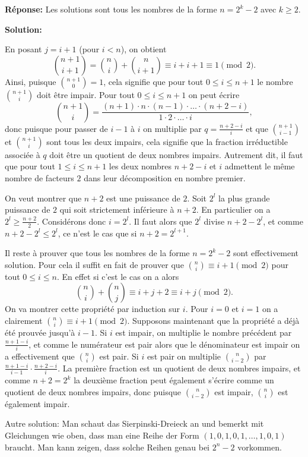 \documentclass[language=german,style=solution]{smo}
\begin{document}
\begin{enumerate}
\textbf{Réponse:} Les solutions sont tous les nombres de la forme $n = 2^k - 2$ avec $k\geq 2$.

\textbf{Solution:}

En posant $j = i+1$ (pour $i < n$), on obtient
\[
	\binom{n+1}{i+1} = \binom{n}{i} + \binom{n}{i+1} \equiv i + i + 1 \equiv 1 \pmod{2}.
\]
Ainsi, puisque $\binom{n+1}{0} = 1$, cela signifie que pour tout $0\leq i \leq n+1$ le nombre $\binom{n+1}{i}$ doit être impair. Pour tout $0\leq i\leq n+1$ on peut écrire
\[
	\binom{n+1}{i} = \frac{(n+1)\cdot n\cdot(n-1)\cdot\ldots\cdot (n+2-i)}{1\cdot 2\cdot\ldots\cdot i},
\]
donc puisque pour passer de $i-1$ à $i$ on multiplie par $q= \frac{n+2-i}{i}$ et que $\binom{n+1}{i-1}$ et $\binom{n+1}{i}$ sont tous les deux impairs, cela signifie que la fraction irréductible associée à $q$ doit être un quotient de deux nombres impairs. Autrement dit, il faut que pour tout $1\leq i\leq n+1$ les deux nombres $n+2-i$ et $i$ admettent le même nombre de facteurs $2$ dans leur décomposition en nombre premier.

On veut montrer que $n+2$ est une puissance de $2$. Soit $2^l$ la plus grande puissance de $2$ qui soit strictement inférieure à $n+2$. En particulier on a $2^l \geq \frac{n+2}{2}$. Considérons donc $i = 2^l$. Il faut alors que $2^l$ divise $n+2 - 2^l$, et comme $n+2 - 2^l \leq 2^l$, ce n'est le cas que si $n+2 = 2^{l+1}$.

Il reste à prouver que tous les nombres de la forme $n = 2^k-2$ sont effectivement solution. Pour cela il suffit en fait de prouver que $\binom{n}{i} \equiv i+1 \pmod{2}$ pour tout $0\leq i\leq n$. En effet si c'est le cas on a alors
\[
	\binom{n}{i} + \binom{n}{j} \equiv i + j + 2 \equiv i + j \pmod{2}.
\]
On va montrer cette propriété par induction sur $i$. Pour $i = 0$ et $i = 1$ on a clairement $\binom{n}{i}\equiv i + 1 \pmod{2}$. Supposons maintenant que la propriété a déjà été prouvée jusqu'à $i-1$. Si $i$ est impair, on multiplie le nombre précédent par $\frac{n+1-i}{i}$, et comme le numérateur est pair alors que le dénominateur est impair on a effectivement que $\binom{n}{i}$ est pair. Si $i$ est pair on multiplie $\binom{n}{i-2}$ par $\frac{n+1-i}{i-1}\cdot\frac{n+2-i}{i}$. La première fraction est un quotient de deux nombres impairs, et comme $n+2 = 2^k$ la deuxième fraction peut également s'écrire comme un quotient de deux nombres impairs, donc puisque $\binom{n}{i-2}$ est impair, $\binom{n}{i}$ est également impair.

Autre solution: Man schaut das Sierpinski-Dreieck an und bemerkt mit Gleichungen wie oben, dass man eine Reihe der Form $(1,0,1,0,1,\ldots,1,0,1)$ braucht. Man kann zeigen, dass solche Reihen genau bei $2^n-2$ vorkommen.


\end{enumerate}
\end{document}
